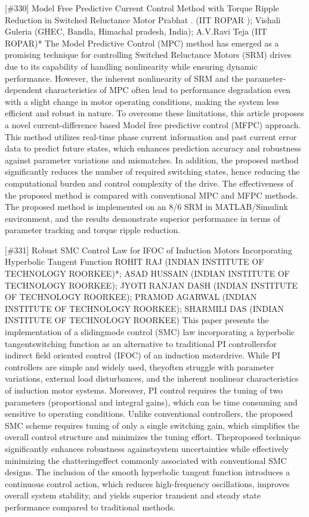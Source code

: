 {} \begin{abstract_online} {[\#330] Model Free Predictive Current Control Method with Torque Ripple Reduction in Switched Reluctance Motor} {} {Prabhat . (IIT ROPAR ); Vishali  Guleria (GHEC, Bandla, Himachal pradesh, India); A.V.Ravi Teja (IIT ROPAR)*} {} The Model Predictive Control (MPC) method has emerged as a promising technique for controlling Switched Reluctance Motors (SRM) drives due to its capability of handling nonlinearity while ensuring dynamic performance. However, the inherent nonlinearity of SRM and the parameter-dependent characteristics of MPC often lead to performance degradation even with a slight change in motor operating conditions, making the system less efficient and robust in nature. To overcome these limitations, this article proposes a novel current-difference based Model free predictive control (MFPC) approach. This method utilizes real-time phase current information and past current error data to predict future states, which enhances prediction accuracy and robustness against parameter variations and mismatches. In addition, the proposed method significantly reduces the number of required switching states, hence reducing the computational burden and control complexity of the drive. The effectiveness of the proposed method is compared with conventional MPC and MFPC methods. The proposed method is implemented on an 8/6 SRM in MATLAB/Simulink environment, and the results demonstrate superior performance in terms of parameter tracking and torque ripple reduction. \end{abstract_online} 
{} \begin{abstract_online} {[\#331] Robust SMC Control Law for IFOC of Induction Motors Incorporating Hyperbolic Tangent Function} {} {ROHIT RAJ (INDIAN INSTITUTE OF TECHNOLOGY ROORKEE)*; ASAD HUSSAIN (INDIAN INSTITUTE OF TECHNOLOGY ROORKEE); JYOTI RANJAN DASH (INDIAN INSTITUTE OF TECHNOLOGY ROORKEE); PRAMOD AGARWAL (INDIAN INSTITUTE OF TECHNOLOGY ROORKEE); SHARMILI  DAS (INDIAN INSTITUTE OF TECHNOLOGY ROORKEE)} {} This paper presents the implementation of a slidingmode control (SMC) law incorporating a hyperbolic tangentswitching function as an alternative to traditional PI controllersfor indirect field oriented control (IFOC) of an induction motordrive. While PI controllers are simple and widely used, theyoften struggle with parameter variations, external load disturbances, and the inherent nonlinear characteristics of induction motor systems. Moreover, PI control requires the tuning of two parameters (proportional and integral gains), which can be time consuming and sensitive to operating conditions. Unlike conventional controllers, the proposed SMC scheme requires tuning of only a single switching gain, which simplifies the overall control structure and minimizes the tuning effort. Theproposed technique significantly enhances robustness againstsystem uncertainties while effectively minimizing the chatteringeffect commonly associated with conventional SMC designs. The inclusion of the smooth hyperbolic tangent function introduces a continuous control action, which reduces high-frequency oscillations, improves overall system stability, and yields superior transient and steady state performance compared to traditional methods. \end{abstract_online} 
